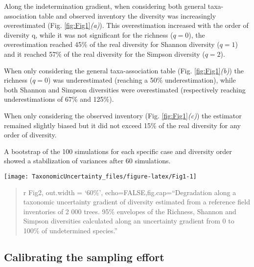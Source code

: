 \documentclass[fleqn,10pt]{ArtEcoFoG} %
\begin{document}
Along the indetermination gradient, when considering both general
taxa-association table and observed inventory the diversity was
increasingly overestimated (Fig. \ref{fig:Fig1}\emph{(a)}). This
overestimation increased with the order of diversity q, while it was not
significant for the richness (\(q=0\)), the overestimation reached 45\%
of the real diversity for Shannon diversity (\(q = 1\)) and it reached
57\% of the real diversity for the Simpson diversity (\(q = 2\)).

When only considering the general taxa-association table (Fig.
\ref{fig:Fig1}\emph{(b)}) the richness (\(q=0\)) was underestimated
(reaching a 50\% underestimation), while both Shannon and Simpson
diversities were overestimated (respectively reaching underestimations
of 67\% and 125\%).

When only considering the observed inventory (Fig.
\ref{fig:Fig1}\emph{(c)}) the estimator remained slightly biased but it
did not exceed 15\% of the real diversity for any order of diversity.

A bootstrap of the 100 simulations for each specific case and diversity
order showed a stabilization of variances after 60 simulations.

\begin{figure*}
\texttt{[image: TaxonomicUncertainty\_files/figure-latex/Fig1-1]} \caption{Indices degradation along a taxonomic uncertainty gradient. 95\% envelopes of the Richness, Shannon and Simpson indices calculated through our propagation method along an uncertainty gradient from 0 to 100\% of undetermined species. In (a) Only expert prior is considered to compute the association frequencies, in (b) both expert and observation prior are equally accounted for in the propagation method and in (c) only the observation prior is considered.}\label{fig:Fig1}
\end{figure*}

\begin{quote}
r Fig2, out.width = `60\%', echo=FALSE,fig.cap=``Degradation along a
taxonomic uncertainty gradient of diversity estimated from a reference
field inventories of 2 000 trees. 95\% envelopes of the Richness,
Shannon and Simpson diversities calculated along an uncertainty gradient
from 0 to 100\% of undetermined species.''
\end{quote}

\subsection{Calibrating the sampling
effort}\label{calibrating-the-sampling-effort}
\end{document}
